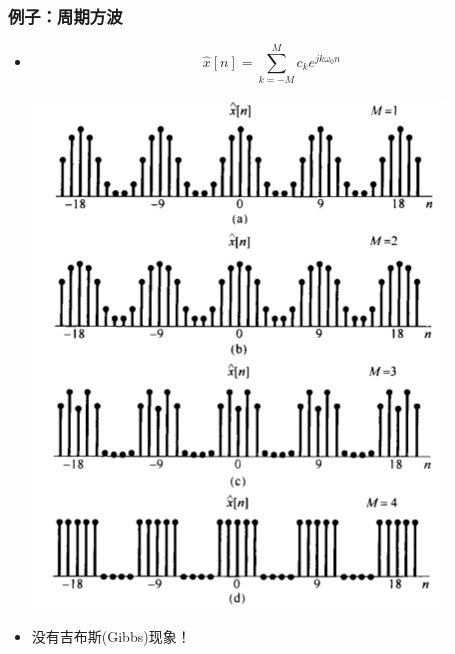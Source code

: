 \documentclass[CJKutf8,xcolor=pdftex,dvipsnames,table]{beamer}
\begin{document}
\begin{CJK*}{UTF8}{song}
      
    
  \begin{frame}
    \frametitle{例子：周期方波}
    \begin{itemize}
    \item \[ \hat{x}[n] = \sum_{k=-M}^{M}c_k e^{jk\omega_0 n}  \]
    	\begin{center}
    	\includegraphics[scale=.32]{ss-c-f3-18}
    	\end{center}    
	
	\item 没有吉布斯(Gibbs)现象！
    \end{itemize}
  \end{frame}     
          

\end{CJK*}
\end{document}
